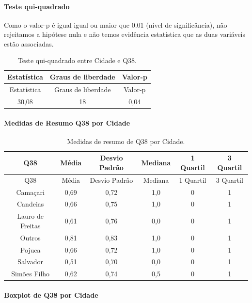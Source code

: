 \documentclass[]{article}
\let\oldparagraph\paragraph
\renewcommand{\paragraph}[1]{\oldparagraph{#1}\mbox{}}
\begin{document}
\hypertarget{teste-qui-quadrado-122}{%
\paragraph{Teste qui-quadrado}\label{teste-qui-quadrado-122}}

Como o valor-p é igual igual ou maior que 0.01 (nível de significância), não rejeitamos a hipótese nula e não temos evidência estatística que as duas variáveis estão associadas.

\begin{longtable}[]{@{}ccc@{}}
\caption{\label{tab:unnamed-chunk-1431}Teste qui-quadrado entre Cidade e Q38.}\tabularnewline
\toprule
Estatística & Graus de liberdade & Valor-p\tabularnewline
\midrule
\endfirsthead
\toprule
Estatística & Graus de liberdade & Valor-p\tabularnewline
\midrule
\endhead
30,08 & 18 & 0,04\tabularnewline
\bottomrule
\end{longtable}

\cleardoublepage

\hypertarget{medidas-de-resumo-q38-por-cidade}{%
\paragraph{Medidas de Resumo Q38 por Cidade}\label{medidas-de-resumo-q38-por-cidade}}

\begin{longtable}[]{@{}cccccc@{}}
\caption{\label{tab:unnamed-chunk-1432}Medidas de resumo de Q38 por Cidade.}\tabularnewline
\toprule
Q38 & Média & Desvio Padrão & Mediana & 1 Quartil & 3 Quartil\tabularnewline
\midrule
\endfirsthead
\toprule
Q38 & Média & Desvio Padrão & Mediana & 1 Quartil & 3 Quartil\tabularnewline
\midrule
\endhead
Camaçari & 0,69 & 0,72 & 1,0 & 0 & 1\tabularnewline
Candeias & 0,66 & 0,75 & 1,0 & 0 & 1\tabularnewline
Lauro de Freitas & 0,61 & 0,76 & 0,0 & 0 & 1\tabularnewline
Outros & 0,81 & 0,83 & 1,0 & 0 & 1\tabularnewline
Pojuca & 0,66 & 0,72 & 1,0 & 0 & 1\tabularnewline
Salvador & 0,51 & 0,70 & 0,0 & 0 & 1\tabularnewline
Simões Filho & 0,62 & 0,74 & 0,5 & 0 & 1\tabularnewline
\bottomrule
\end{longtable}

\hypertarget{boxplot-de-q38-por-cidade}{%
\paragraph{Boxplot de Q38 por Cidade}\label{boxplot-de-q38-por-cidade}}
\end{document}
